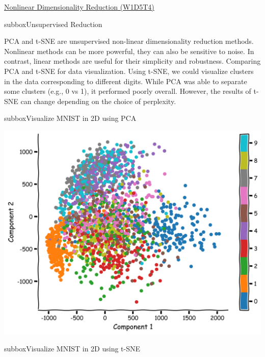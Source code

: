 \begin{textbox}{\href{https://compneuro.neuromatch.io/tutorials/W1D5_DimensionalityReduction/student/W1D5_Tutorial4.html}{ Nonlinear Dimensionality Reduction (W1D5T4)} }
\begin{subbox}{subbox}{Unsupervised Reduction}
\scriptsize

PCA and t-SNE are unsupervised non-linear dimensionality  reduction methods.
Nonlinear methods can be more powerful, they can also be sensitive to noise. In contrast, linear methods are useful for their simplicity and robustness.
Comparing PCA and t-SNE for data visualization. Using t-SNE, we could visualize clusters in the data corresponding to different digits. While PCA was able to separate some clusters (e.g., 0 vs 1), it performed poorly overall.
However, the results of t-SNE can change depending on the choice of perplexity.
\end{subbox}
\begin{subbox}{subbox}{Visualize MNIST in 2D using PCA}
\scriptsize

\centering
\includegraphics[scale=0.15]{Figures/DM/DMFigure5.png}

\end{subbox}
\begin{subbox}{subbox}{Visualize MNIST in 2D using t-SNE}
\scriptsize


\end{subbox}
\end{textbox}
